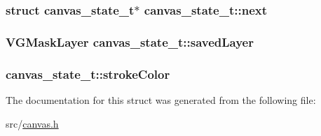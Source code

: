 \subsubsection[{next}]{\setlength{\rightskip}{0pt plus 5cm}struct {\bf canvas\+\_\+state\+\_\+t}$\ast$ canvas\+\_\+state\+\_\+t\+::next}\label{structcanvas__state__t_affd976ea64b3c8ac9ee660b20e8be5a9}
\hypertarget{structcanvas__state__t_a46394e3d2c0bfac283b820478a8e54e6}{}
\subsubsection[{saved\+Layer}]{\setlength{\rightskip}{0pt plus 5cm}V\+G\+Mask\+Layer canvas\+\_\+state\+\_\+t\+::saved\+Layer}\label{structcanvas__state__t_a46394e3d2c0bfac283b820478a8e54e6}
\hypertarget{structcanvas__state__t_af12f76ebfaaba2fd2aca008b5771a7a8}{}
\subsubsection[{stroke\+Color}]{ canvas\+\_\+state\+\_\+t\+::stroke\+Color}\label{structcanvas__state__t_af12f76ebfaaba2fd2aca008b5771a7a8}


The documentation for this struct was generated from the following file\+:\begin{DoxyCompactItemize}
\item 
src/\hyperlink{canvas_8h}{canvas.\+h}\end{DoxyCompactItemize}
